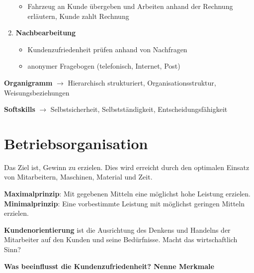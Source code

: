 \begin{enumerate}
  \begin{itemize}
  \item
    Fahrzeug an Kunde übergeben und Arbeiten anhand der Rechnung
    erläutern, Kunde zahlt Rechnung
  \end{itemize}
\item
  \textbf{Nachbearbeitung}

  \begin{itemize}
  \item
    Kundenzufriedenheit prüfen anhand von Nachfragen
  \item
    anonymer Fragebogen (telefonisch, Internet, Post)
  \end{itemize}
\end{enumerate}

\textbf{Organigramm} $\to$ Hierarchisch strukturiert,
Organisationsstruktur, Weisungsbeziehungen

\textbf{Softskills} $\to$ Selbstsicherheit, Selbstständigkeit,
Entscheidungsfähigkeit

\section{Betriebsorganisation}\label{betriebsorganisation}

Das Ziel ist, Gewinn zu erzielen. Dies wird erreicht durch den optimalen
Einsatz von Mitarbeitern, Maschinen, Material und Zeit.

\textbf{Maximalprinzip}: Mit gegebenen Mitteln eine möglichst hohe
Leistung erzielen. \textbf{Minimalprinzip}: Eine vorbestimmte Leistung
mit möglichst geringen Mitteln erzielen.

\textbf{Kundenorientierung} ist die Ausrichtung des Denkens und Handelns
der Mitarbeiter auf den Kunden und seine Bedürfnisse. Macht das
wirtschaftlich Sinn?

\textbf{Was beeinflusst die Kundenzufriedenheit? Nenne Merkmale}

